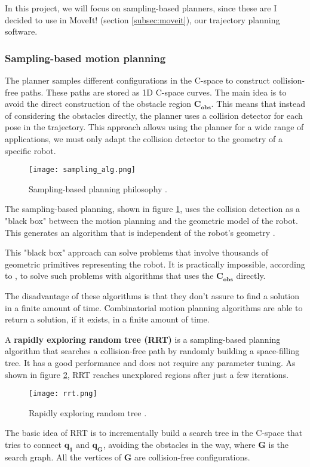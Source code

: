 In this project, we will focus on sampling-based planners, since these are I decided to use in MoveIt! (section \ref{subsec:moveit}), our trajectory planning software.

\subsubsection{Sampling-based motion planning}
\label{subsec:planning}

The planner samples different configurations in the C-space to construct collision-free paths. These paths are stored as 1D C-space curves. The main idea is to avoid the direct construction of the obstacle region $\bm{C_{obs}}$. This means that instead of considering the obstacles directly, the planner uses a collision detector for each pose in the trajectory. This approach allows using the planner for a wide range of applications, we must only adapt the collision detector to the geometry of a specific robot.
\begin{figure}[H]
	\centering
	\texttt{[image: sampling\_alg.png]}
	\vspace{-10pt}
	\caption{Sampling-based planning philosophy \citep[chap. 5, page 185]{planning}.}
	\vspace{-15pt}
	\label{fig:sampling}
\end{figure}

The sampling-based planning, shown in figure \ref{fig:sampling}, uses the collision detection as a "black box" between the motion planning and the geometric model of the robot. This generates an algorithm that is independent of the robot's geometry \citep{planning} .

This "black box" approach can solve problems that involve thousands of geometric primitives representing the robot. It is practically impossible, according to \citet{Handbook}, to solve such problems with algorithms that uses the $\bm{C_{obs}}$ directly.

The disadvantage of these algorithms is that they don't assure to find a solution in a finite amount of time. Combinatorial motion planning algorithms are able to return a solution, if it exists, in a finite amount of time.

A \textbf{rapidly exploring random tree (RRT)} is a sampling-based planning algorithm that searches a collision-free path by randomly building a space-filling tree. It has a good performance and does not require any parameter tuning. As shown in figure \ref{fig:rrt}, RRT reaches unexplored regions after just a few iterations. 
\begin{figure}[H]
	\centering
	\texttt{[image: rrt.png]}
	\vspace{-10pt}
	\caption{Rapidly exploring random tree \citep[chap. 5, page 230]{planning}.}
	\vspace{-15pt}
	\label{fig:rrt}
\end{figure}
The basic idea of RRT is to incrementally build a search tree in the C-space that tries to connect $\bm{q_{1}}$ and $\bm{q_{G}}$, avoiding the obstacles in the way, where $\bm{G}$ is the search graph. All the vertices of $\bm{G}$ are collision-free configurations. 

